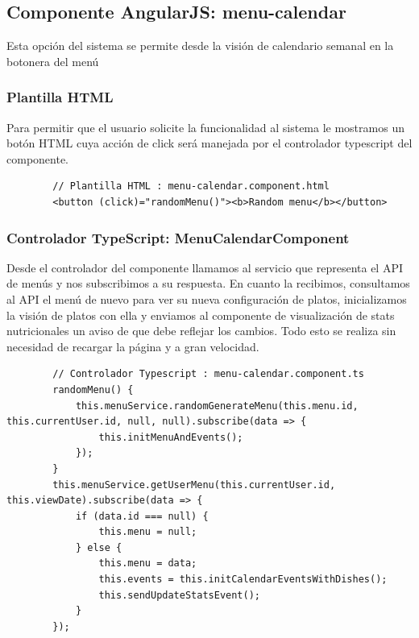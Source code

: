\documentclass[12pt, a4paper, twoside]{book}
\begin{document}
	\subsection{Componente AngularJS: menu-calendar}
	Esta opción del sistema se permite desde la visión de calendario semanal en la botonera del menú
	\subsubsection{Plantilla HTML}
	Para permitir que el usuario solicite la funcionalidad al sistema le mostramos un botón HTML cuya acción de click será manejada por el controlador typescript del componente.
	\begin{lstlisting}
		// Plantilla HTML : menu-calendar.component.html
		<button (click)="randomMenu()"><b>Random menu</b></button>
	\end{lstlisting}
	\subsubsection{Controlador TypeScript: MenuCalendarComponent}
	Desde el controlador del componente llamamos al servicio que representa el API de menús y nos subscribimos a su respuesta. 
	En cuanto la recibimos, consultamos al API el menú de nuevo para ver su nueva configuración de platos, inicializamos la visión de platos con ella y enviamos al componente de visualización de stats nutricionales un aviso de que debe reflejar los cambios. Todo esto se realiza sin necesidad de recargar la página y a gran velocidad.
	\begin{lstlisting}
		// Controlador Typescript : menu-calendar.component.ts
		randomMenu() {
			this.menuService.randomGenerateMenu(this.menu.id, this.currentUser.id, null, null).subscribe(data => {
				this.initMenuAndEvents();
			});
		}
		this.menuService.getUserMenu(this.currentUser.id, this.viewDate).subscribe(data => {
			if (data.id === null) {
				this.menu = null;
			} else {
				this.menu = data;
				this.events = this.initCalendarEventsWithDishes();
				this.sendUpdateStatsEvent();
			}
		});
	\end{lstlisting}
\end{document}
